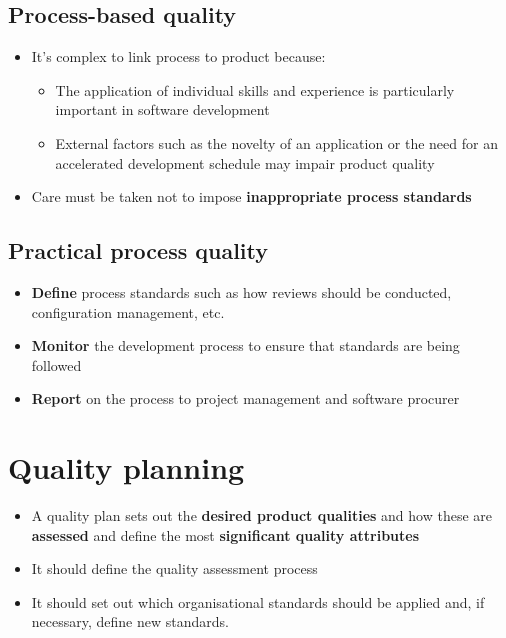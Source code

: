 \documentclass{article}
\begin{document}
\subsection{Process-based quality}

\begin{itemize}
  \item It's complex to link process to product because:
  \begin{itemize}
    \item The application of individual skills and experience is particularly
important in software development
    \item External factors such as the novelty of an application or the need for an
accelerated development schedule may impair product quality
  \end{itemize}
  \item Care must be taken not to impose \textbf{inappropriate process standards}
\end{itemize}

\subsection{Practical process quality}

\begin{itemize}
  \item \textbf{Define} process standards such as how reviews should be conducted,
configuration management, etc.
  \item \textbf{Monitor} the development process to ensure that standards are being followed
  \item \textbf{Report} on the process to project management and software procurer
\end{itemize}

\section{Quality planning}

\begin{itemize}
  \item A quality plan sets out the \textbf{desired product qualities} and how these are \textbf{assessed} and define the most \textbf{significant quality attributes}
  \item It should define the quality assessment process
  \item It should set out which organisational standards should be applied and, if necessary, define new standards.
\end{itemize}
\end{document}

